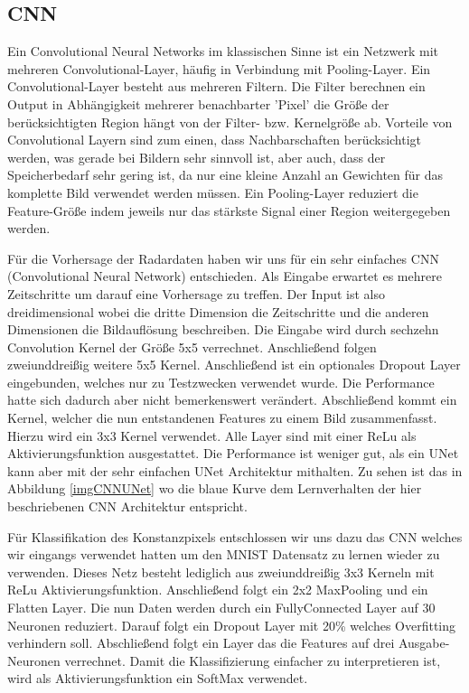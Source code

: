 \subsection{CNN}
\label{kapitelCNN}
Ein Convolutional Neural Networks im klassischen Sinne ist ein Netzwerk mit mehreren Convolutional-Layer, häufig in Verbindung mit Pooling-Layer. Ein Convolutional-Layer besteht aus mehreren Filtern. Die Filter berechnen ein Output in Abhängigkeit mehrerer benachbarter 'Pixel' die Größe der berücksichtigten Region hängt von der Filter- bzw. Kernelgröße ab.
Vorteile von Convolutional Layern sind zum einen, dass Nachbarschaften berücksichtigt werden, was gerade bei Bildern sehr sinnvoll ist, aber auch, dass der Speicherbedarf sehr gering ist, da nur eine kleine Anzahl an Gewichten für das komplette Bild verwendet werden müssen.
Ein Pooling-Layer reduziert die Feature-Größe indem jeweils nur das stärkste Signal einer Region weitergegeben werden.

Für die Vorhersage der Radardaten haben wir uns für ein sehr einfaches CNN (Convolutional Neural Network) entschieden.
Als Eingabe erwartet es mehrere Zeitschritte um darauf eine Vorhersage zu treffen. Der Input ist also dreidimensional wobei die dritte Dimension die Zeitschritte und die anderen Dimensionen die Bildauflösung beschreiben. Die Eingabe wird durch sechzehn Convolution Kernel der Größe 5x5 verrechnet. Anschließend folgen zweiunddreißig weitere 5x5 Kernel. Anschließend ist ein optionales Dropout Layer eingebunden, welches nur zu Testzwecken verwendet wurde. Die Performance hatte sich dadurch aber nicht bemerkenswert verändert. Abschließend kommt ein Kernel, welcher die nun entstandenen Features zu einem Bild zusammenfasst. Hierzu wird ein 3x3 Kernel verwendet. Alle Layer sind mit einer ReLu als Aktivierungsfunktion ausgestattet.
Die Performance ist weniger gut, als ein UNet kann aber mit der sehr einfachen UNet Architektur mithalten. Zu sehen ist das in Abbildung \ref{imgCNNUNet} wo die blaue Kurve dem Lernverhalten der hier beschriebenen CNN Architektur entspricht.

Für Klassifikation des Konstanzpixels entschlossen wir uns dazu das CNN welches wir eingangs verwendet hatten um den MNIST Datensatz zu lernen wieder zu verwenden. Dieses Netz besteht lediglich aus zweiunddreißig 3x3 Kerneln mit ReLu Aktivierungsfunktion. Anschließend folgt ein 2x2 MaxPooling und ein Flatten Layer. Die nun  Daten werden durch ein FullyConnected Layer auf 30 Neuronen reduziert. Darauf folgt ein Dropout Layer mit 20\% welches Overfitting verhindern soll. Abschließend folgt ein Layer das die Features auf drei Ausgabe-Neuronen verrechnet. Damit die Klassifizierung einfacher zu interpretieren ist, wird als Aktivierungsfunktion ein SoftMax verwendet.

